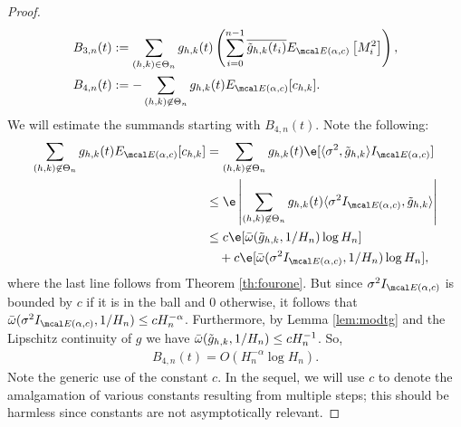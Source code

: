 \begin{appendices}
\begin{proof}
\begin{align}
  &B_{3,n}(t) := \sumt g_{h,k}(t)\left( \sum_{i=0}^{n-1} \btghki \eind\left[M_i^2\right] \right), \notag\\
  &B_{4,n}(t) := - \sum_{\substack{(h,k) \not\in \Theta_n }}g_{h,k}(t)\eind[\chk]. 
  \label{}
\end{align}
We will estimate the summands starting with $B_{4,n}(t)$. Note the following:
\begin{align}
  \sum_{\substack{(h,k) \not\in \Theta_n }}g_{h,k}(t)\eind[\chk] &=  \sum_{\substack{(h,k) \not\in \Theta_n }}g_{h,k}(t)\e[\inner{\sigma^2}{ \tghk}\indvol] \notag\\ 
&\le  \e\left\vert\sum_{\substack{(h,k) \not\in \Theta_n }}g_{h,k}(t)\inner{\sigma^2 \indvol}{ \tghk}\right\vert \notag\\
&\le c\e[\modc{\tghk}{1/H_n}\log H_n] \notag \\
&\quad + c\e[\modc{\sigma^2\indvol}{1/H_n} \log H_n]\notag,
\end{align}
where the last  line follows from Theorem \eqref{th:fourone}. But since  $\sigma^2 \indvol$ is bounded by $c$ if it is in the \holder ball   and $0$ otherwise, it follows that $\modc{\sigma^2\indvol}{1/H_n} \le c H_n^{-\alpha}$. Furthermore, by Lemma \eqref{lem:modtg} and the Lipschitz continuity of $g$ we have ${\bar{\omega}}({\tilde{g}_{h,k}},1/H_n) \le c H^{-1}_n$.  So,  
\begin{align}
 B_{4,n}(t) =  O( H_n^{-\alpha}\log H_n).
  \label{eq:B4}
\end{align}
Note the generic use of the constant  $c$. In the sequel, we will use $c$ to denote the amalgamation of various constants resulting from multiple steps; this should be harmless since  constants are not asymptotically relevant. 


\end{proof}
\end{appendices}
